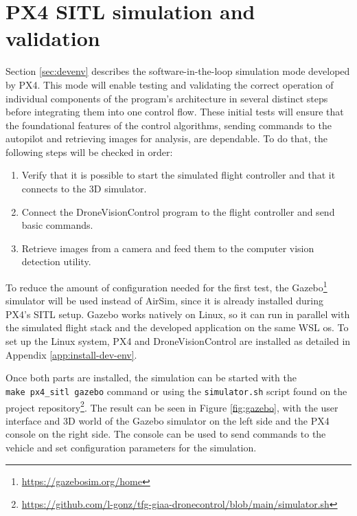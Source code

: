 \section{PX4 SITL simulation and validation}
\label{sec:test-2-sitl}

Section \ref{sec:devenv} describes the software-in-the-loop simulation mode developed by PX4.
This mode will enable testing and validating the correct operation of individual components of the program's architecture in several distinct steps before integrating them into one control flow.
These initial tests will ensure that the foundational features of the control algorithms, sending commands to the autopilot and retrieving images for analysis, are dependable.
To do that, the following steps will be checked in order:
\begin{enumerate}
    \item Verify that it is possible to start the simulated flight controller and that it connects to the 3D simulator.
    \item Connect the DroneVisionControl program to the flight controller and send basic commands.
    \item Retrieve images from a camera and feed them to the computer vision detection utility.
\end{enumerate}

To reduce the amount of configuration needed for the first test, the Gazebo\footnote{\url{https://gazebosim.org/home}} simulator will be used instead of AirSim, since it is already installed during PX4's SITL setup.
Gazebo works natively on Linux, so it can run in parallel with the simulated flight stack and the developed application on the same WSL \acrshort{os}.
To set up the Linux system, PX4 and DroneVisionControl are installed as detailed in Appendix \ref{app:install-dev-env}.

Once both parts are installed, the simulation can be started with the \texttt{make\ px4\_sitl\ gazebo} command or using the \texttt{simulator.sh} script found on the project repository\footnote{\url{https://github.com/l-gonz/tfg-giaa-dronecontrol/blob/main/simulator.sh}}.
The result can be seen in Figure \ref{fig:gazebo}, with the user interface and 3D world of the Gazebo simulator on the left side and the PX4 console on the right side.
The console can be used to send commands to the vehicle and set configuration parameters for the simulation.

